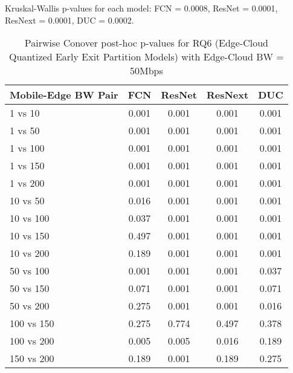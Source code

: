 \begin{table}[h]
\centering
\caption{Pairwise Conover post-hoc p-values for RQ6 (Edge-Cloud Quantized Early Exit Partition Models) with Edge-Cloud BW = 50Mbps}
\label{tab:conover_edge_cloud_quantized_earlyexit_partition_ec50}
\smallskip
Kruskal-Wallis p-values for each model: FCN = 0.0008, ResNet = 0.0001, ResNext = 0.0001, DUC = 0.0002.

\begin{tabular}{lcccc}
\toprule
Mobile-Edge BW Pair & FCN & ResNet & ResNext & DUC \\
\midrule
1 vs 10 & 0.001 & 0.001 & 0.001 & 0.001 \\
1 vs 50 & 0.001 & 0.001 & 0.001 & 0.001 \\
1 vs 100 & 0.001 & 0.001 & 0.001 & 0.001 \\
1 vs 150 & 0.001 & 0.001 & 0.001 & 0.001 \\
1 vs 200 & 0.001 & 0.001 & 0.001 & 0.001 \\
10 vs 50 & 0.016 & 0.001 & 0.001 & 0.001 \\
10 vs 100 & 0.037 & 0.001 & 0.001 & 0.001 \\
10 vs 150 & 0.497 & 0.001 & 0.001 & 0.001 \\
10 vs 200 & 0.189 & 0.001 & 0.001 & 0.001 \\
50 vs 100 & 0.001 & 0.001 & 0.001 & 0.037 \\
50 vs 150 & 0.071 & 0.001 & 0.001 & 0.071 \\
50 vs 200 & 0.275 & 0.001 & 0.001 & 0.016 \\
100 vs 150 & 0.275 & 0.774 & 0.497 & 0.378 \\
100 vs 200 & 0.005 & 0.005 & 0.016 & 0.189 \\
150 vs 200 & 0.189 & 0.001 & 0.189 & 0.275 \\
\bottomrule
\end{tabular}
\end{table}

